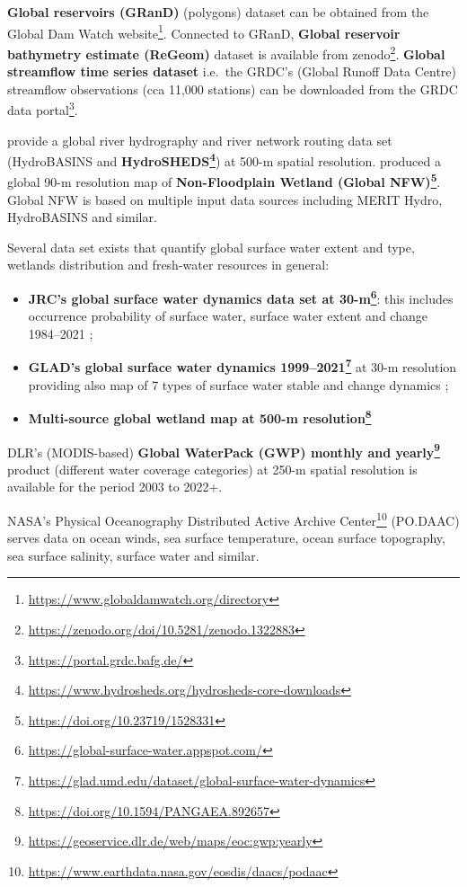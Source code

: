 \documentclass[
  graybox,natbib,nospthms]{svmono}
\providecommand{\tightlist}{%
  \setlength{\itemsep}{0pt}\setlength{\parskip}{0pt}}
\providecommand{\tightlist}{\setlength{\itemsep}{0pt}\setlength{\parskip}{0pt}}
\renewcommand{\href}[2]{#2 (\url{#1})}
\renewcommand{\href}[2]{#2\footnote{\url{#1}}}
\begin{document}
\textbf{Global reservoirs (GRanD)} (polygons) dataset can be obtained from the \href{https://www.globaldamwatch.org/directory}{Global Dam Watch website}.
Connected to GRanD, \textbf{Global reservoir bathymetry estimate (ReGeom)} dataset is available from \href{https://zenodo.org/doi/10.5281/zenodo.1322883}{zenodo}.
\textbf{Global streamflow time series dataset} i.e.~the GRDC's (Global Runoff Data Centre) streamflow observations (cca 11,000 stations) can be downloaded from the \href{https://portal.grdc.bafg.de/}{GRDC data portal}.

\citet{lehner2013global} provide a global river hydrography and river network routing data set (HydroBASINS and \textbf{\href{https://www.hydrosheds.org/hydrosheds-core-downloads}{HydroSHEDS}}) at 500-m spatial resolution.
\citet{lane2023mapping} produced a global 90-m resolution map of \textbf{\href{https://doi.org/10.23719/1528331}{Non-Floodplain Wetland (Global NFW)}}.
Global NFW is based on multiple input data sources including MERIT Hydro,
HydroBASINS and similar.

Several data set exists that quantify global surface water extent and type, wetlands distribution and
fresh-water resources in general:

\begin{itemize}
\tightlist
\item
  \textbf{\href{https://global-surface-water.appspot.com/}{JRC's global surface water dynamics data set at 30-m}}: this includes occurrence probability of surface water, surface water extent and change 1984--2021 \citep{Pekel2016};
\item
  \textbf{\href{https://glad.umd.edu/dataset/global-surface-water-dynamics}{GLAD's global surface water dynamics 1999--2021}} at 30-m resolution providing also map of 7 types of surface water stable and change dynamics \citep{pickens2020mapping};
\item
  \textbf{\href{https://doi.org/10.1594/PANGAEA.892657}{Multi-source global wetland map at 500-m resolution}} \citep{tootchi2019multi}
\end{itemize}

DLR's (MODIS-based) \textbf{\href{https://geoservice.dlr.de/web/maps/eoc:gwp:yearly}{Global WaterPack (GWP) monthly and yearly}} product (different water coverage categories) at 250-m spatial resolution
is available for the period 2003 to 2022+.

\href{https://www.earthdata.nasa.gov/eosdis/daacs/podaac}{NASA's Physical Oceanography Distributed Active Archive Center} (PO.DAAC) serves
data on ocean winds, sea surface temperature, ocean surface topography, sea surface salinity, surface water and similar.
\end{document}
